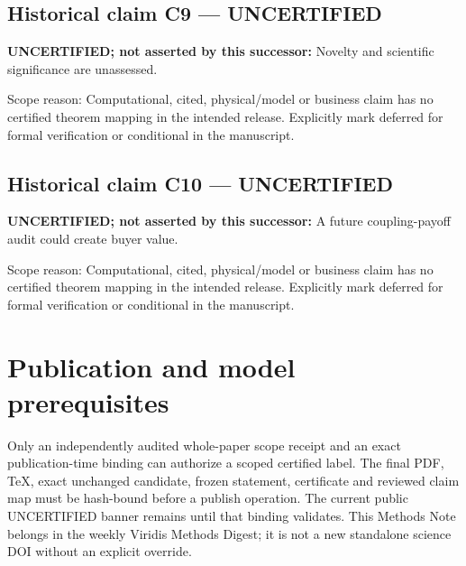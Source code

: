\documentclass[11pt]{article}
\begin{document}
\subsection*{Historical claim C9 --- UNCERTIFIED}
\textbf{UNCERTIFIED; not asserted by this successor:} Novelty and scientific significance are unassessed.
\par Scope reason: Computational, cited, physical/model or business claim has no certified theorem mapping in the intended release. Explicitly mark deferred for formal verification or conditional in the manuscript.
\subsection*{Historical claim C10 --- UNCERTIFIED}
\textbf{UNCERTIFIED; not asserted by this successor:} A future coupling-payoff audit could create buyer value.
\par Scope reason: Computational, cited, physical/model or business claim has no certified theorem mapping in the intended release. Explicitly mark deferred for formal verification or conditional in the manuscript.
\section*{Publication and model prerequisites}
Only an independently audited whole-paper scope receipt and an exact publication-time binding can authorize a scoped certified label. The final PDF, TeX, exact unchanged candidate, frozen statement, certificate and reviewed claim map must be hash-bound before a publish operation. The current public UNCERTIFIED banner remains until that binding validates. This Methods Note belongs in the weekly Viridis Methods Digest; it is not a new standalone science DOI without an explicit override.
\end{document}
